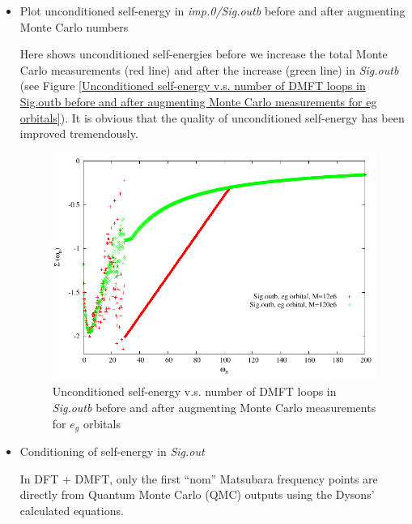 \documentclass[12 pt]{article}
\begin{document}
\begin{itemize}[leftmargin=0.2in]
\begin{itemize}[leftmargin=0.5in]
  \cleardoublepage

		  \item Plot unconditioned self-energy in \emph{imp.0/Sig.outb} before and after augmenting Monte 
Carlo numbers

  Here shows unconditioned self-energies before we increase the total Monte Carlo measurements (red line) 
and after the increase (green line) in \emph{Sig.outb} (see Figure 
\ref{Unconditioned self-energy v.s. number of DMFT loops in Sig.outb before and after augmenting Monte Carlo 
measurements for eg orbitals}). It is obvious that the quality of unconditioned self-energy has been improved 
tremendously. 

  \begin{figure}[ht]
    \centering
    \captionsetup{justification=centering}
    \caption{Unconditioned self-energy v.s. number of DMFT loops in \emph{Sig.outb} before and after augmenting Monte
 Carlo measurements for $e_g$ orbitals}
    \label{Unconditioned self-energy v.s. number of DMFT loops in Sig.outb before and after augmenting Monte Carlo
 measurements for eg orbitals}
    \vspace{2ex}
    \includegraphics[scale=1.3]{gnuplotSelfEnergySigoutbMC}
  \end{figure}

  \cleardoublepage

		  \item Conditioning of self-energy in \emph{Sig.out}

  In DFT + DMFT, only the first ``nom'' Matsubara frequency points are directly from Quantum Monte Carlo (QMC) 
outputs using the Dysons' calculated equations. 


\end{itemize}
\end{itemize}
\end{document}
